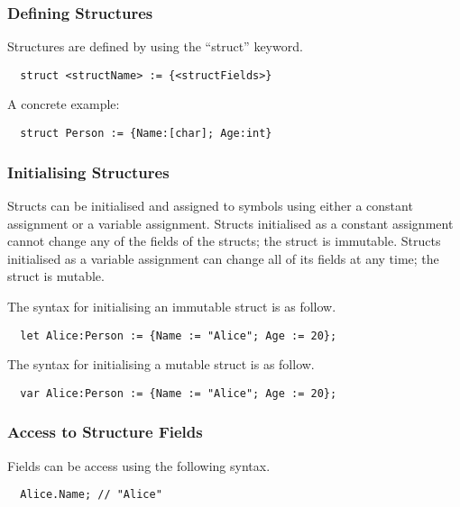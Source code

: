 \subsubsection{Defining Structures}
\label{sec:defStructures}

Structures are defined by using the \enquote{struct} keyword. 

\begin{verbatim}
  struct <structName> := {<structFields>}
\end{verbatim}

A concrete example:

\begin{verbatim}
  struct Person := {Name:[char]; Age:int}
\end{verbatim}

\subsubsection{Initialising Structures}
\label{sec:initStructures}

Structs can be initialised and assigned to symbols using either a constant assignment or a variable assignment. Structs initialised as a constant assignment cannot change any of the fields of the structs; the struct is immutable. Structs initialised as a variable assignment can change all of its fields at any time; the struct is mutable.

The syntax for initialising an immutable struct is as follow.

\begin{verbatim}
  let Alice:Person := {Name := "Alice"; Age := 20};
\end{verbatim}

The syntax for initialising a mutable struct is as follow.

\begin{verbatim}
  var Alice:Person := {Name := "Alice"; Age := 20};
\end{verbatim}

\subsubsection{Access to Structure Fields}
\label{sec:accessStructFields}

Fields can be access using the following syntax.

\begin{verbatim}
  Alice.Name; // "Alice"
\end{verbatim}

